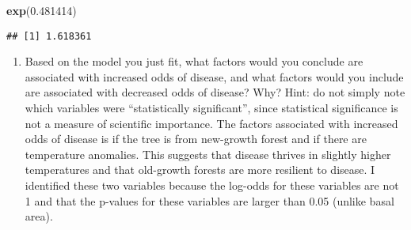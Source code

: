 \documentclass[
]{article}
\newenvironment{Shaded}{\begin{snugshade}}{\end{snugshade}}
\newcommand{\FloatTok}[1]{\textcolor[rgb]{0.00,0.00,0.81}{#1}}
\newcommand{\FunctionTok}[1]{\textcolor[rgb]{0.13,0.29,0.53}{\textbf{#1}}}
\newcommand{\NormalTok}[1]{#1}
\providecommand{\tightlist}{%
  \setlength{\itemsep}{0pt}\setlength{\parskip}{0pt}}
\begin{document}
\begin{Shaded}
\begin{Highlighting}[]
\FunctionTok{exp}\NormalTok{(}\FloatTok{0.481414}\NormalTok{)}
\end{Highlighting}
\end{Shaded}

\begin{verbatim}
## [1] 1.618361
\end{verbatim}

\begin{enumerate}
\def\labelenumi{\alph{enumi}.}
\setcounter{enumi}{1}
\tightlist
\item
  Based on the model you just fit, what factors would you conclude are
  associated with increased odds of disease, and what factors would you
  include are associated with decreased odds of disease? Why? Hint: do
  not simply note which variables were ``statistically significant'',
  since statistical significance is not a measure of scientific
  importance. The factors associated with increased odds of disease is
  if the tree is from new-growth forest and if there are temperature
  anomalies. This suggests that disease thrives in slightly higher
  temperatures and that old-growth forests are more resilient to
  disease. I identified these two variables because the log-odds for
  these variables are not 1 and that the p-values for these variables
  are larger than 0.05 (unlike basal area).
\end{enumerate}
\end{document}
